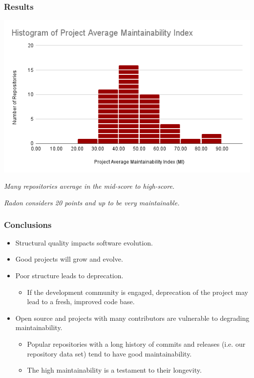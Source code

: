 \documentclass{beamer}
\begin{document}
\begin{frame}
  \frametitle{Results}
  \begin{center}
    \includegraphics[width=0.8\columnwidth]{Histogram of Project Average Maintainability Index_BucketSize_10.png}
  \end{center}
  \begin{center}
    {\small \emph{Many repositories average in the mid-score to high-score.}} 
    
    {\small \emph{Radon considers 20 points and up to be very maintainable.}}
  \end{center}
\end{frame}

\begin{frame}
  \frametitle{Conclusions}
  \begin{itemize}
    \item Structural quality impacts software evolution.
    
    \vspace{0.35cm}
    \item Good projects will grow and evolve.
    
    \vspace{0.35cm}
    \item Poor structure leads to deprecation.
    \begin{itemize}
      \item If the development community is engaged, deprecation of 
        \newline the project may lead to a fresh, improved code base.
    \end{itemize}
    
    \vspace{0.35cm}
    \item Open source and projects with many contributors are vulnerable to degrading maintainability.
    \begin{itemize}
      \item Popular repositories with a long history of commits and releases 
        \newline (i.e. our repository data set) tend to have good maintainability.
      \item The high maintainability is a testament to their longevity.
    \end{itemize}
  \end{itemize}
\end{frame}
\end{document}
